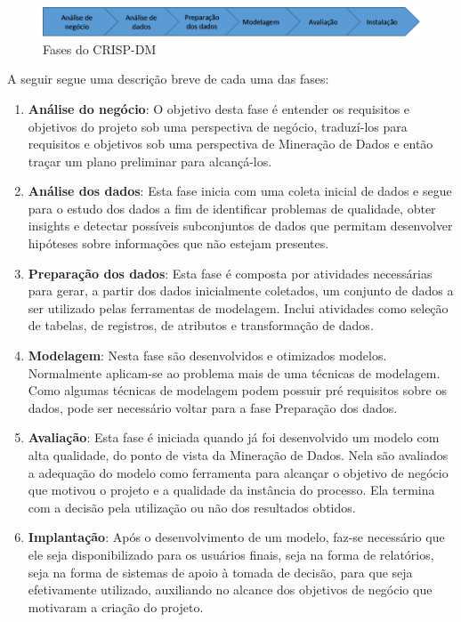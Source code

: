 \begin{figure}[H]
	\includegraphics[scale=0.8]{img/CRISP-DM-main.png}
	\caption{Fases do CRISP-DM}
	\label{img:CRISP-DM-diagram}
\end{figure}

A seguir segue uma descrição breve de cada uma das fases:

\begin{enumerate}

\item \textbf{Análise do negócio}:
O objetivo desta fase é entender os requisitos e objetivos do projeto sob uma perspectiva de negócio, traduzí-los para requisitos e objetivos sob uma perspectiva de Mineração de Dados e então traçar um plano preliminar para alcançá-los.

\item \textbf{Análise dos dados}:
Esta fase inicia com uma coleta inicial de dados e segue para o estudo dos dados a fim de identificar problemas de qualidade, obter insights e detectar possíveis subconjuntos de dados que permitam desenvolver hipóteses sobre informações que não estejam presentes.

\item \textbf{Preparação dos dados}:
Esta fase é composta por atividades necessárias para gerar, a partir dos dados inicialmente coletados, um conjunto de dados a ser utilizado pelas ferramentas de modelagem. Inclui atividades como seleção de tabelas, de registros, de atributos e transformação de dados.

\item \textbf{Modelagem}:
Nesta fase são desenvolvidos e otimizados modelos. Normalmente aplicam-se ao problema mais de uma técnicas de modelagem. Como algumas técnicas de modelagem podem possuir pré requisitos sobre os dados, pode ser necessário voltar para a fase Preparação dos dados.

\item \textbf{Avaliação}:
Esta fase é iniciada quando já foi desenvolvido um modelo com alta qualidade, do ponto de vista da Mineração de Dados. Nela são avaliados a adequação do modelo como ferramenta para alcançar o objetivo de negócio que motivou o projeto e a qualidade da instância do processo. Ela termina com a decisão pela utilização ou não dos resultados obtidos.

\item \textbf{Implantação}:
Após o desenvolvimento de um modelo, faz-se necessário que ele seja disponibilizado para os usuários finais, seja na forma de relatórios, seja na forma de sistemas de apoio à tomada de decisão, para que seja efetivamente utilizado, auxiliando no alcance dos objetivos de negócio que motivaram a criação do projeto.

\end{enumerate}

